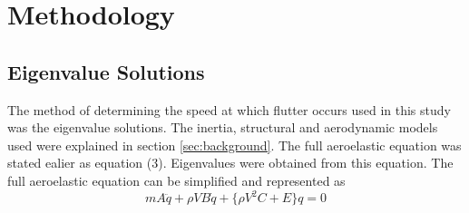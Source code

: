 \documentclass[11pt]{article}
\begin{document}
\section{Methodology}
\label{sec:method}
\subsection{Eigenvalue Solutions}
\label{sec:eig}
\iffalse
The method of determining the speed at which flutter occurs used in this study was the eigenvalue solutions. The inertia, structural and aerodynamic models used were explained in section \ref{sec:background}. The full aeroelastic equation was stated ealier as equation (6). Eigenvalues were obtained from this equation. 

The eigenvalues can be obtained by solving the determinant of the gathered 2x2 matrix of the full aeroelastic equation. This yields a quatic equation. Both of these equations can be found in the appendix in equation\\

To obtain the eigenvalues, Routh-Hurwitz stability analysis was applied to the quartic equation which yielded,

\begin{equation}
    b_4b_1^2-b_1b_2b_3+b_0b_3^2 = 0
\end{equation}

The lowest positive root with zero imaginary part represented the speed at which flutter occurs.
\fi
The method of determining the speed at which flutter occurs used in this study was the eigenvalue solutions. The inertia, structural and aerodynamic models used were explained in section \ref{sec:background}. The full aeroelastic equation was stated ealier as equation (3). Eigenvalues were obtained from this equation. The full aeroelastic equation can be simplified and represented as\\
\begin{equation}\label{eq:simplified-aeroe}
    mA\ddot{q}+\rho VB\dot{q}+\{\rho V^2 C+E\}q = 0
\end{equation}
\end{document}

